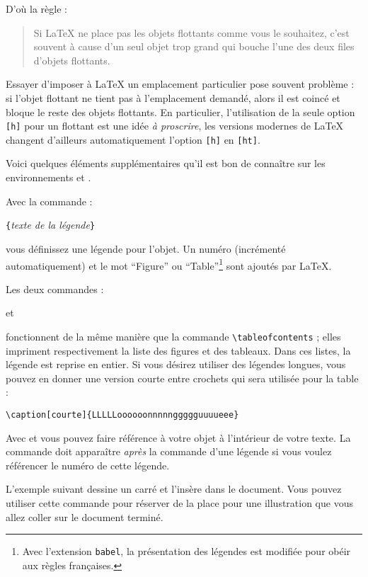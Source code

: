 D'où la règle :
\begin{quote}
Si \LaTeX{} ne place pas les objets flottants comme vous le souhaitez,
c'est souvent à cause d'un seul objet trop grand qui bouche l'une des
deux files d'objets flottants.
\end{quote}

Essayer d'imposer à \LaTeX{} un emplacement particulier pose souvent
problème : si l'objet flottant ne tient pas à l'emplacement demandé,
alors il est coincé et bloque le reste des objets flottants. En
particulier, l'utilisation de la seule option \verb+[h]+ pour un
flottant est une idée \emph{à proscrire}, les versions modernes de
\LaTeX{} changent d'ailleurs automatiquement l'option \verb+[h]+ en
\verb+[ht]+.

Voici quelques éléments supplémentaires qu'il est bon de connaître sur
les environnements  et .

Avec la commande :
\begin{lscommand}
\verb|{|\emph{texte de la légende}\verb|}|
\end{lscommand}
\noindent
vous définissez une légende pour l'objet. Un numéro (incrémenté
 automatiquement) et le mot \enquote{Figure} ou
 \enquote{Table}\footnote{Avec l'extension \texttt{babel}, la
 présentation des légendes est modifiée pour obéir aux règles
 françaises.} sont ajoutés par \LaTeX.

Les deux commandes :
\begin{lscommand}
 et 
\end{lscommand}
\noindent fonctionnent de la même manière que la commande
\verb|\tableofcontents| ; elles impriment respectivement la liste des
figures et des tableaux. Dans ces listes, la légende est reprise en
entier. Si vous désirez utiliser des légendes longues, vous pouvez
en donner une version courte entre crochets qui sera utilisée pour la
table :
\begin{code}
\verb|\caption[courte]{LLLLLoooooonnnnnggggguuuueee}|
\end{code}

Avec  et  vous pouvez faire référence à votre objet
à l'intérieur de votre texte. La commande  doit apparaître
\emph{après} la commande  d'une légende si vous voulez
référencer le numéro de cette légende.

L'exemple suivant dessine un carré et l'insère dans le document. Vous
pouvez utiliser cette commande pour réserver de la place pour une
illustration que vous allez coller sur le document terminé.

